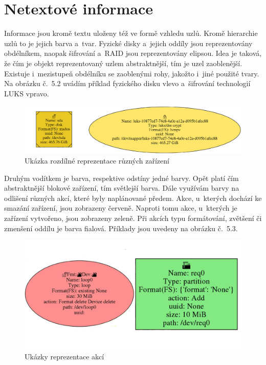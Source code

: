 \documentclass[printed,color,table,oneside,nolot,nolof]{fithesis}
\begin{document}
\section{Netextové informace}
  Informace jsou kromě textu uloženy též ve formě vzhledu uzlů. Kromě hierarchie uzlů to je jejich barva a~tvar. Fyzické disky a~jejich oddíly jsou
	reprezentovány obdélníkem, naopak šifrování a~RAID jsou reprezentovány
	elipsou. Idea je taková, že čím je objekt reprezentovaný uzlem abstraktnější, tím je uzel zaoblenější. Existuje i~mezistupeň obdélníku se zaoblenými
	rohy, jakožto i~jiné použité tvary. Na obrázku č.~5.2 uvádím příklad fyzického disku vlevo a~šifrování technologií LUKS vpravo.
\begin{figure}[h!]
	\label{fig:Rozdíly zařízení}
	\caption{Ukázka rozdílné reprezentace různých zařízení}
	\centering
	\includegraphics[width=.9\columnwidth]{pictures/disk_and_luks.jpg}
\end{figure}

	Druhým vodítkem je barva, respektive odstíny jedné barvy. Opět platí čím abstraktnější blokové zařízení, tím světlejší barva. Dále využívám
	barvy na odlišení různých akcí, které byly naplánované předem. Akce, u~kterých dochází ke smazání zařízení, jsou zobrazeny červeně. Naproti tomu akce,
	u~kterých je zařízení vytvořeno, jsou zobrazeny zeleně. Při akcích typu formátování, zvětšení či zmenšení oddílu je barva fialová. Příklady jsou uvedeny na obrázku č.~5.3.

\begin{figure}
	\label{fig:Reprezentace naplánované akce}
	\caption{Ukázky reprezentace akcí}
	\centering
	\includegraphics[width=.9\columnwidth]{pictures/actions.jpg}
\end{figure}
  
\end{document}
